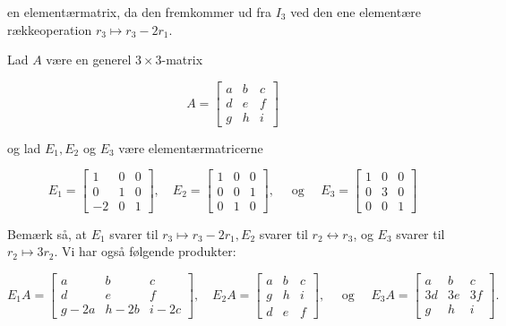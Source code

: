 en elementærmatrix, da den fremkommer ud fra $I_3$ ved den ene elementære rækkeoperation $r_3 \mapsto r_3-2 r_1$.

\begin{example}

Lad $A$ være en generel $3 \times 3$-matrix

\[
A=\left[\begin{array}{lll}
a & b & c \\
d & e & f \\
g & h & i
\end{array}\right]
\]

og lad $E_1, E_2$ og $E_3$ være elementærmatricerne

\[
E_1=\left[\begin{array}{ccc}
1 & 0 & 0 \\
0 & 1 & 0 \\
-2 & 0 & 1
\end{array}\right], \quad E_2=\left[\begin{array}{lll}
1 & 0 & 0 \\
0 & 0 & 1 \\
0 & 1 & 0
\end{array}\right], \quad \text { og } \quad E_3=\left[\begin{array}{lll}
1 & 0 & 0 \\
0 & 3 & 0 \\
0 & 0 & 1
\end{array}\right]
\]
\end{example}

Bemærk så, at $E_1$ svarer til $r_3 \mapsto r_3-2 r_1, E_2$ svarer til $r_2 \longleftrightarrow r_3$, og $E_3$ svarer til $r_2 \mapsto 3 r_2$. Vi har også følgende produkter:

\[
E_1 A=\left[\begin{array}{ccc}
a & b & c \\
d & e & f \\
g-2 a & h-2 b & i-2 c
\end{array}\right], \quad E_2 A=\left[\begin{array}{ccc}
a & b & c \\
g & h & i \\
d & e & f
\end{array}\right], \quad \text { og } \quad E_3 A=\left[\begin{array}{ccc}
a & b & c \\
3 d & 3 e & 3 f \\
g & h & i
\end{array}\right] .
\]


